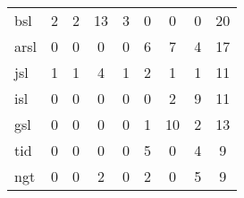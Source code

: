 \begin{table}[]
{\begin{tabular}{l|ccccccc|c}
            \acrshort{bsl}                                                                                        & \cellcolor[HTML]{FFFCF6}2                        & \cellcolor[HTML]{FFFCF6}2 & \cellcolor[HTML]{FFECC7}13 & \cellcolor[HTML]{FFFBF2}3  & 0                          & 0                          & 0                          & 20                                              \\
            \acrshort{arsl}                                                                                       & 0                                                & 0                         & 0                          & 0                          & \cellcolor[HTML]{FFF6E5}6  & \cellcolor[HTML]{FFF5E1}7  & \cellcolor[HTML]{FFF9EE}4  & 17                                              \\
            \acrshort{jsl}                                                                                        & \cellcolor[HTML]{FFFEFB}1                        & \cellcolor[HTML]{FFFEFB}1 & \cellcolor[HTML]{FFF9EE}4  & \cellcolor[HTML]{FFFEFB}1  & \cellcolor[HTML]{FFFCF6}2  & \cellcolor[HTML]{FFFEFB}1  & \cellcolor[HTML]{FFFEFB}1  & 11                                              \\
            \acrshort{isl}                                                                                        & 0                                                & 0                         & 0                          & 0                          & 0                          & \cellcolor[HTML]{FFFCF6}2  & \cellcolor[HTML]{FFF5E1}9  & 11                                              \\
            \acrshort{gsl}                                                                                        & 0                                                & 0                         & 0                          & 0                          & \cellcolor[HTML]{FFFEFB}1  & \cellcolor[HTML]{FFF1D4}10 & \cellcolor[HTML]{FFFCF6}2  & 13                                              \\
            \acrshort{tid}                                                                                        & 0                                                & 0                         & 0                          & 0                          & \cellcolor[HTML]{FFF8EA}5  & 0                          & \cellcolor[HTML]{FFF9EE}4  & 9                                               \\
            \acrshort{ngt}                                                                                        & 0                                                & 0                         & \cellcolor[HTML]{FFFCF6}2  & 0                          & \cellcolor[HTML]{FFFCF6}2  & 0                          & \cellcolor[HTML]{FFF8EA}5  & 9                                               \\

\end{tabular}}
\end{table}
